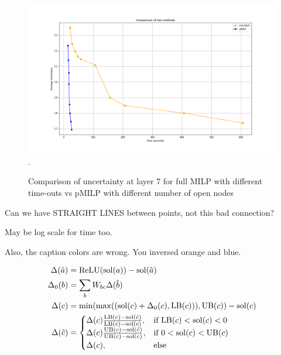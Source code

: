 	
		\begin{figure}[h]\hspace*{-0.8cm}
		\includegraphics[scale=0.4]{Layer7_comparison_notlog.png}.
		\caption{Comparison of uncertainty at layer 7 for full MILP with different time-outs vs pMILP with different number of open nodes}
		\label{fig5}
	\end{figure}
	
	
Can we have STRAIGHT LINES between points, not this bad connection?

May be log scale for time too.

Also, the caption colors are wrong. You inversed orange and blue.



\begin{align*}
	\Delta(\hat{a}) &= \mathrm{ReLU}(\mathrm{sol}(a))-\mathrm{sol}(\hat{a})\\
	\Delta_0(b) &= \sum_{b} W_{bc}\Delta(\hat{b})\\
	\Delta(c) &= \min(\max((\mathrm{sol}(c)+\Delta_0(c),\mathrm{LB}(c))),\mathrm{UB}(c))-\mathrm{sol}(c)\\
	\Delta(\hat{c}) &=
	\begin{cases}
		\Delta(c)\frac{\mathrm{LB}(c) - \mathrm{sol}(\hat{c})}{\mathrm{LB}(c) - \mathrm{sol}(c)},  &\text{if } \mathrm{LB}(c)< \mathrm{sol}(c) < 0\\
		\Delta(c)\frac{\mathrm{UB}(c) - \mathrm{sol}(\hat{c})}{\mathrm{UB}(c) - \mathrm{sol}(c)},  &\text{if }  0< \mathrm{sol}(c) < \mathrm{UB}(c)\\
		\Delta(c),  &\text{else } 	 
	\end{cases}
\end{align*}